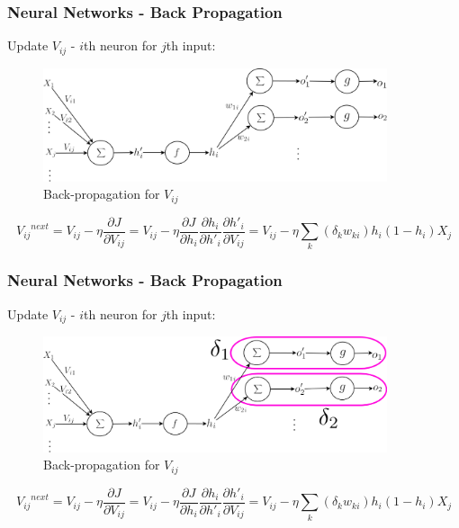 \documentclass{beamer}
\begin{document}
\begin{frame}
\frametitle{Neural Networks - Back Propagation}
Update $V_{ij}$ - $i$th neuron for $j$th input:
\begin{figure}[t!]
    \centering
    \includegraphics[width=0.9\textwidth]{../paper/pictures/figures/BP2.png}
    \caption{Back-propagation for $V_{ij}$}
    \label{fig:BP2}
\end{figure}
$$
{{V_{ij}}^{next}}
= V_{ij} - \eta\frac{\partial J}{\partial V_{ij}}
= V_{ij} - \eta\frac{\partial J}{\partial h_i}\frac{\partial h_i}{\partial h'_i}\frac{\partial h'_i}{\partial V_{ij}}
= V_{ij} - \eta\sum_k(\delta_kw_{ki})h_i(1-h_i)X_j
$$
\end{frame}

\begin{frame}
\frametitle{Neural Networks - Back Propagation}
Update $V_{ij}$ - $i$th neuron for $j$th input:
\begin{figure}[t!]
    \centering
    \includegraphics[width=0.9\textwidth]{./pictures/figures/BP2_with_error.png}
    \caption{Back-propagation for $V_{ij}$}
    \label{fig:BP2}
\end{figure}
$$
{{V_{ij}}^{next}}
= V_{ij} - \eta\frac{\partial J}{\partial V_{ij}}
= V_{ij} - \eta\frac{\partial J}{\partial h_i}\frac{\partial h_i}{\partial h'_i}\frac{\partial h'_i}{\partial V_{ij}}
= V_{ij} - \eta\sum_k(\delta_kw_{ki})h_i(1-h_i)X_j
$$
\end{frame}
\end{document}

